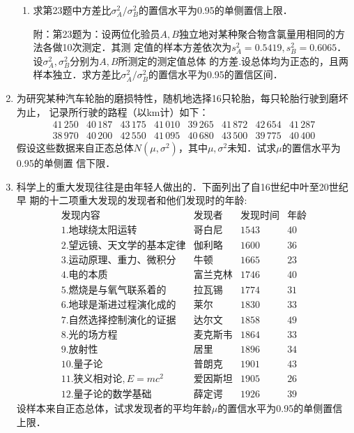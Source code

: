 \documentclass[10pt,a4paper]{article}
\begin{document}
\begin{enumerate}
\begin{enumerate}
        \item 求第23题中方差比$\sigma_A^2/\sigma_B^2$的置信水平为0.95的单侧置信上限．
        
        {\kaishu 附：第23题为：设两位化验员$A, B$独立地对某种聚合物含氯量用相同的方法各做10次测定．其测
        定值的样本方差依次为$s_A^2=0.5419,s_B^2=0.6065$．设$\sigma_A^2,\sigma_B^2$分别为$A,B$所测定的测定值总体
        的方差.设总体均为正态的，且两样本独立．求方差比$\sigma_A^2/\sigma_B^2$的置信水平为0.95的置信区间．}
    \end{enumerate}
    \clearpage



    \item 为研究某种汽车轮胎的磨损特性，随机地选择16只轮胎，每只轮胎行驶到磨坏为止，
    记录所行驶的路程（以km计）如下：
    $$\begin{array}{cccccccc}
        41\, 250 & 40\, 187 & 43\, 175 & 41\, 010 & 39\, 265 & 41\, 872 & 42\, 654 & 41\, 287\\
        38\, 970 & 40\, 200 & 42\, 550 & 41\, 095 & 40\, 680 & 43\, 500 & 39\, 775 & 40\, 400 
    \end{array}$$
    假设这些数据来自正态总体$N(\mu,\sigma^2)$，其中$\mu,\sigma^2$未知．试求$\mu$的置信水平为0.95的单侧置
    信下限．
    \clearpage


    \item 科学上的重大发现往往是由年轻人做出的．下面列出了自16世纪中叶至20世纪早
    期的十二项重大发现的发现者和他们发现时的年龄:
    $$\begin{array}{llll}
        \mbox{发现内容} & \mbox{发现者} & \mbox{发现时间} & \mbox{年龄}\\
        \mbox{1.地球绕太阳运转} & \mbox{哥白尼} & 1543   &   40 \\  
        \mbox{2.望远镜、天文学的基本定律} & \mbox{伽利略} &  1600  & 36   \\  
        \mbox{3.运动原理、重力、微积分} & \mbox{牛顿} &  1665  &  23  \\  
        \mbox{4.电的本质} & \mbox{富兰克林} &   1746 &  40  \\  
        \mbox{5.燃烧是与氧气联系着的} & \mbox{拉瓦锡} & 1774   &  31  \\  
        \mbox{6.地球是渐进过程演化成的} & \mbox{莱尔} &  1830  &  33  \\  
        \mbox{7.自然选择控制演化的证据} & \mbox{达尔文} &  1858  & 49   \\  
        \mbox{8.光的场方程} & \mbox{麦克斯韦} &  1864  &  33  \\  
        \mbox{9.放射性} & \mbox{居里} &  1896  &  34  \\  
        \mbox{10.量子论} & \mbox{普朗克} & 1901   &  43  \\  
        \mbox{11.狭义相对论},E=mc^2 & \mbox{爱因斯坦} &  1905  &  26  \\  
        \mbox{12.量子论的数学基础} & \mbox{薛定谔} & 1926   &  39  
    \end{array}$$
    设样本来自正态总体，试求发现者的平均年龄$\mu$的置信水平为0.95的单侧置信上限．


    


  

\end{enumerate}
\end{document}
